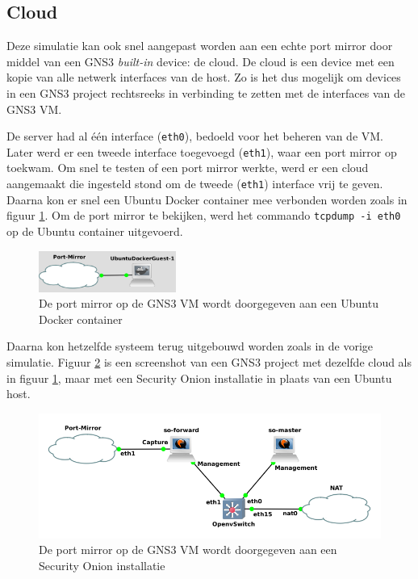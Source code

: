 \documentclass[a4paper, 12pt]{report}
\begin{document}
\subsection{Cloud}
Deze simulatie kan ook snel aangepast worden aan een echte port mirror door middel van een GNS3 \emph{built-in} device: de cloud.
De cloud is een device met een kopie van alle netwerk interfaces van de host.
Zo is het dus mogelijk om devices in een GNS3 project rechtsreeks in verbinding te zetten met de interfaces van de GNS3 VM.

De server had al één interface (\lstinline|eth0|), bedoeld voor het beheren van de VM.
Later werd er een tweede interface toegevoegd (\lstinline|eth1|), waar een port mirror op toekwam.
Om snel te testen of een port mirror werkte, werd er een cloud aangemaakt die ingesteld stond om de tweede (\lstinline|eth1|) interface vrij te geven.
Daarna kon er snel een Ubuntu Docker container mee verbonden worden zoals in figuur \ref{fig:gns3-port-mirror-ubuntu}.
Om de port mirror te bekijken, werd het commando \lstinline|tcpdump -i eth0| op de Ubuntu container uitgevoerd.

\begin{figure}[H]
  \centering
  \includegraphics[width=0.4\textwidth]{gns3-port-mirror-ubuntu}
  \caption{De port mirror op de GNS3 VM wordt doorgegeven aan een Ubuntu Docker container}
  \label{fig:gns3-port-mirror-ubuntu}
\end{figure}

Daarna kon hetzelfde systeem terug uitgebouwd worden zoals in de vorige simulatie.
Figuur \ref{fig:gns3-port-mirror-so} is een screenshot van een GNS3 project met dezelfde cloud als in figuur \ref{fig:gns3-port-mirror-ubuntu}, maar met een Security Onion installatie in plaats van een Ubuntu host.

\begin{figure}[H]
  \centering
  \includegraphics[width=\textwidth]{gns3-port-mirror-so}
  \caption{De port mirror op de GNS3 VM wordt doorgegeven aan een Security Onion installatie}
  \label{fig:gns3-port-mirror-so}
\end{figure}
\end{document}
